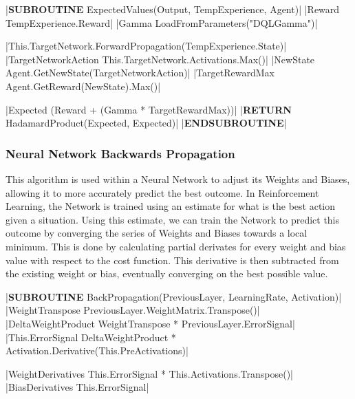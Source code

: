 \begin{flushleft}
                \vspace{0.2cm}
                \begin{pseudocode}
|\textbf{SUBROUTINE} ExpectedValues(Output, TempExperience, Agent)|  
    |Reward \leftarrow TempExperience.Reward|
    |Gamma \leftarrow LoadFromParameters("DQLGamma")|

    |This.TargetNetwork.ForwardPropagation(TempExperience.State)|
    |TargetNetworkAction \leftarrow This.TargetNetwork.Activations.Max()|
    |NewState \leftarrow Agent.GetNewState(TargetNetworkAction)|
    |TargetRewardMax \leftarrow Agent.GetReward(NewState).Max()|

    |Expected \leftarrow (Reward + (Gamma * TargetRewardMax))|
    |\textbf{RETURN} HadamardProduct(Expected, Expected)|
|\textbf{ENDSUBROUTINE}|
                \end{pseudocode}
                \vspace{0.5cm}
            \subsubsection{Neural Network Backwards Propagation}
                This algorithm is used within a Neural Network to adjust its Weights and Biases, allowing it to more accurately predict the
                best outcome. In Reinforcement Learning, the Network is trained using an estimate for what is the best action given a situation.
                Using this estimate, we can train the Network to predict this outcome by converging the series of Weights and Biases towards a
                local minimum. This is done by calculating partial derivates for every weight and bias value with respect to the cost function.
                This derivative is then subtracted from the existing weight or bias, eventually converging on the best possible value.

                \vspace{0.2cm}
                \begin{pseudocode}
|\textbf{SUBROUTINE} BackPropagation(PreviousLayer, LearningRate, Activation)|
    |WeightTranspose \leftarrow PreviousLayer.WeightMatrix.Transpose()|
    |DeltaWeightProduct \leftarrow WeightTranspose * PreviousLayer.ErrorSignal|
    |This.ErrorSignal \leftarrow DeltaWeightProduct * Activation.Derivative(This.PreActivations)|

    |WeightDerivatives \leftarrow This.ErrorSignal * This.Activations.Transpose()|
    |BiasDerivatives \leftarrow This.ErrorSignal|


\end{pseudocode}
\end{flushleft}
